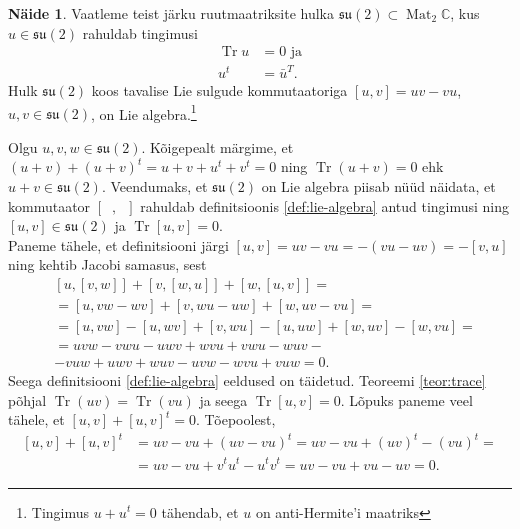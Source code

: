 \documentclass[a4paper,12pt]{article}
\theoremstyle{plain}
\theoremstyle{definition}
\newtheorem{naide}{Näide}[section]
\numberwithin{equation}{section}
\DeclareMathOperator{\Mat}{Mat}
\DeclareMathOperator{\Tr}{Tr}
\begin{document}
\begin{naide} \label{naide:su2}
Vaatleme teist järku ruutmaatriksite hulka $\mathfrak{su}\left(2\right) \subset \Mat_2 \mathbb{C}$, kus $u \in \mathfrak{su}\left(2\right)$ rahuldab tingimusi
\begin{align}
\Tr u &= 0 \text{ ja} \label{eq:su2-tr=0}\\ 
u^t &= \bar{u}^T. \label{eq:su2-antihermitian}
\end{align}
Hulk $\mathfrak{su}\left(2\right)$ koos tavalise Lie sulgude kommutaatoriga $\left[u,v\right] = uv - vu$, $u, v \in \mathfrak{su}\left(2\right)$, on Lie algebra.\footnote{Tingimus $u + u^t = 0$ tähendab, et $u$ on anti-Hermite'i maatriks}

Olgu $u, v, w \in \mathfrak{su}\left(2\right)$. Kõigepealt märgime, et $\left(u + v\right) + \left(u + v\right)^t = u + v + u^t + v^t = 0$ ning $\Tr \left(u + v\right) = 0$ ehk $u + v \in \mathfrak{su}\left(2\right)$. Veendumaks, et $\mathfrak{su}\left(2\right)$ on Lie algebra piisab nüüd näidata, et kommutaator $\left[\phantom{u}, \phantom{u}\right]$ rahuldab definitsioonis \ref{def:lie-algebra} antud tingimusi ning $\left[u,v\right] \in \mathfrak{su}\left(2\right)$ ja $\Tr \left[u,v\right] = 0$. \\
Paneme tähele, et definitsiooni järgi $\left[u,v\right] = uv - vu = - \left(vu - uv\right) = - \left[v,u\right]$ ning 
kehtib Jacobi samasus, sest
\begin{align*}
&\left[u, \left[v, w\right]\right] + \left[v, \left[w, u\right]\right] + \left[w, \left[u, v\right]\right] = \\
&= \left[u, vw - wv \right] + \left[v, wu - uw \right] + \left[w, uv - vu \right] = \\
&= \left[u, vw\right] - \left[u, wv\right] + \left[v, wu\right] - \left[u, uw\right] + \left[w, uv\right] - \left[w, vu\right] = \\
&= uvw - vwu - uwv + wvu + vwu - wuv - \\
&- vuw + uwv + wuv - uvw - wvu + vuw = 0.
\end{align*}
Seega definitsiooni \ref{def:lie-algebra} eeldused on täidetud. Teoreemi \ref{teor:trace} põhjal $\Tr \left(uv\right) = \Tr \left(vu\right)$ ja seega $\Tr \left[u,v\right] = 0$. Lõpuks paneme veel tähele, et $\left[u,v\right] + \left[u,v\right]^t = 0$. Tõepoolest,
\begin{align*}
\left[u,v\right] + \left[u,v\right]^t &= uv - vu + \left(uv - vu\right)^t = uv - vu + \left(uv\right)^t - \left(vu\right)^t = \\
&= uv - vu + v^t u^t - u^t v^t = uv - vu + vu - uv = 0.
\end{align*}
\end{naide}
\end{document}
